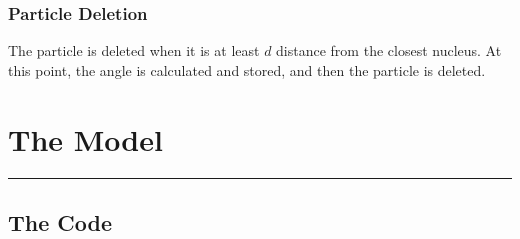 \documentclass[11pt]{article}
\begin{document}
\hypertarget{particle-deletion}{%
\subsubsection{Particle Deletion}\label{particle-deletion}}

The particle is deleted when it is at least \(d\) distance from the
closest nucleus. At this point, the angle is calculated and stored, and
then the particle is deleted.

    \hypertarget{the-model}{%
\section{The Model}\label{the-model}}

\begin{center}\rule{0.5\linewidth}{0.5pt}\end{center}

\hypertarget{the-code}{%
\subsection{The Code}\label{the-code}}
\end{document}

